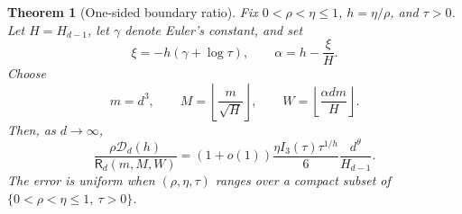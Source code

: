 \documentclass[11pt,letterpaper]{article}
\newtheorem{theorem}{Theorem}[section]
\theoremstyle{definition}
\begin{document}
\begin{theorem}[One-sided boundary ratio]
\label{thm:boundary-ratio}
Fix $0<\rho <\eta\le1$, $h=\eta/\rho $, and $\tau>0$. Let
$H=H_{d-1}$, let $\gamma$ denote Euler's constant, and set
\begin{equation}
  \xi=-h(\gamma+\log\tau),
  \qquad
  \alpha=h-\frac{\xi}{H}.
  \label{eq:boundary-alpha}
\end{equation}
Choose
\begin{equation}
  m=d^3,\qquad
  M=\left\lfloor\frac{m}{\sqrt H}\right\rfloor,\qquad
  W=\left\lfloor\frac{\alpha dm}{H}\right\rfloor.
  \label{eq:boundary-parameters}
\end{equation}
Then, as $d\to\infty$,
\begin{equation}
  \frac{\rho \mathscr D_d(h)}{\mathsf R_d(m,M,W)}
  =
  (1+o(1))
  \frac{\eta I_3(\tau)\tau^{1/h}}6
  \frac{d^\theta}{H_{d-1}}.
  \label{eq:boundary-ratio}
\end{equation}
The error is uniform when $(\rho ,\eta,\tau)$ ranges over a compact subset of
$\{0<\rho <\eta\le1,\ \tau>0\}$.
\end{theorem}
\end{document}
